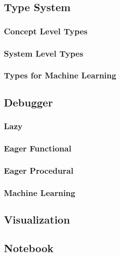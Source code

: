 \documentclass[../main.tex]{subfiles}
\begin{document}
\subsection{}

\subsection{Type System}

\subsubsection{Concept Level Types}


\subsubsection{System Level Types}

\subsubsection{Types for Machine Learning}

\subsection{Debugger}

\subsubsection{Lazy}

\subsubsection{Eager Functional}

\subsubsection{Eager Procedural}

\subsubsection{Machine Learning}


\subsection{Visualization}

\subsection{Notebook}
\end{document}
